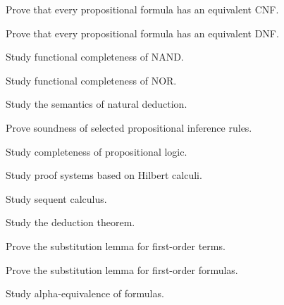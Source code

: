 \begin{exercise}[4]
Prove that every propositional formula has an equivalent CNF.
\end{exercise}

\begin{exercise}[4]
Prove that every propositional formula has an equivalent DNF.
\end{exercise}

\begin{exercise}[4]
Study functional completeness of NAND.
\end{exercise}

\begin{exercise}[4]
Study functional completeness of NOR.
\end{exercise}

\begin{exercise}[4]
Study the semantics of natural deduction.
\end{exercise}

\begin{exercise}[4]
Prove soundness of selected propositional inference rules.
\end{exercise}

\begin{exercise}[4]
Study completeness of propositional logic.
\end{exercise}

\begin{exercise}[4]
Study proof systems based on Hilbert calculi.
\end{exercise}

\begin{exercise}[4]
Study sequent calculus.
\end{exercise}

\begin{exercise}[4]
Study the deduction theorem.
\end{exercise}

\begin{exercise}[4]
Prove the substitution lemma for first-order terms.
\end{exercise}

\begin{exercise}[4]
Prove the substitution lemma for first-order formulas.
\end{exercise}

\begin{exercise}[4]
Study alpha-equivalence of formulas.
\end{exercise}

